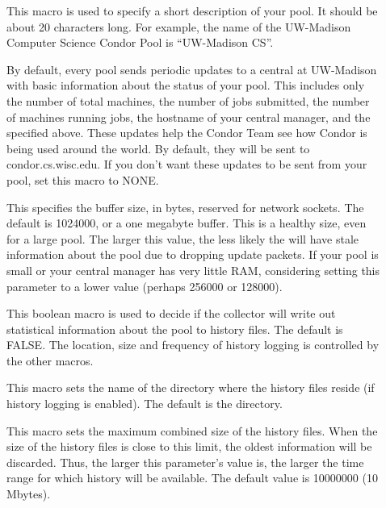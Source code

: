 \begin{description}
\item[] \label{param:CollectorName}
  This macro is used to specify a short description of your pool.
  It should be about 20 characters long.  For example, the name of the
  UW-Madison Computer Science Condor Pool is ``UW-Madison CS''.  

\item[]
  \label{param:CondorDevelopersCollector} By default, every pool sends
  periodic updates to a central  at UW-Madison with
  basic information about the status of your pool.  This includes only
  the number of total machines, the number of jobs submitted, the
  number of machines running jobs, the hostname of your central
  manager, and the  specified above.  These
  updates help the Condor Team see how Condor is being used around the world.
  By default, they will be sent to condor.cs.wisc.edu.  If you don't want
  these updates to be sent from your pool, set this macro to
  NONE. 

\item[] 
  \label{param:CollectorSocketBufsize} This specifies the buffer size, in
  bytes, reserved for  network sockets.  The default is
  1024000, or a one megabyte buffer.  This is a healthy size, even for a large
  pool.  The larger this value, the less likely the  will
  have stale information about the pool due to dropping update packets.  If
  your pool is small or your central manager has very little RAM, considering
  setting this parameter to a lower value (perhaps 256000 or 128000).

\item[] \label{param:KeepPoolHistory}
  This boolean macro is used to decide if the collector will write
  out statistical information about the pool to history files. The default
  is FALSE. The location, size and frequency of history logging is controlled
  by the other macros.

\item[] \label{param:PoolHistoryDir}
  This macro sets the name of the directory where the history
  files reside (if history logging is enabled).
  The default is the  directory.

\item[]
  \label{param:PoolHistoryMaxStorage} 
  This macro sets the maximum combined size of the history files.
  When the size of the history files is close to this limit, the oldest
  information will be discarded.
  Thus, the larger this parameter's value is, the larger the time
  range for which history will be available.  The default value is
  10000000 (10 Mbytes).


\end{description}
